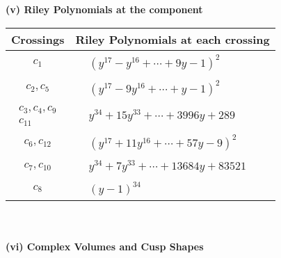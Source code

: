 \documentclass[1p]{elsarticle_modified}
\theoremstyle{definition}
\begin{document}
\newpage\renewcommand{\arraystretch}{1}
\flushleft \textbf{(v) Riley Polynomials at the component}\newline \\
\begin{tabular}{m{50pt}|m{274pt}}
Crossings & \hspace{64pt}Riley Polynomials at each crossing \\
\hline $$\begin{aligned}c_{1}\end{aligned}$$&$\begin{aligned}
&(y^{17}- y^{16}+\cdots+9 y-1)^{2}
\end{aligned}$\\
\hline $$\begin{aligned}c_{2},c_{5}\end{aligned}$$&$\begin{aligned}
&(y^{17}-9 y^{16}+\cdots+y-1)^{2}
\end{aligned}$\\
\hline $$\begin{aligned}c_{3},c_{4},c_{9}\\c_{11}\end{aligned}$$&$\begin{aligned}
&y^{34}+15 y^{33}+\cdots+3996 y+289
\end{aligned}$\\
\hline $$\begin{aligned}c_{6},c_{12}\end{aligned}$$&$\begin{aligned}
&(y^{17}+11 y^{16}+\cdots+57 y-9)^{2}
\end{aligned}$\\
\hline $$\begin{aligned}c_{7},c_{10}\end{aligned}$$&$\begin{aligned}
&y^{34}+7 y^{33}+\cdots+13684 y+83521
\end{aligned}$\\
\hline $$\begin{aligned}c_{8}\end{aligned}$$&$\begin{aligned}
&(y-1)^{34}
\end{aligned}$\\
\hline
\end{tabular}\\~\\
\newpage\flushleft \textbf{(vi) Complex Volumes and Cusp Shapes}
\end{document}
